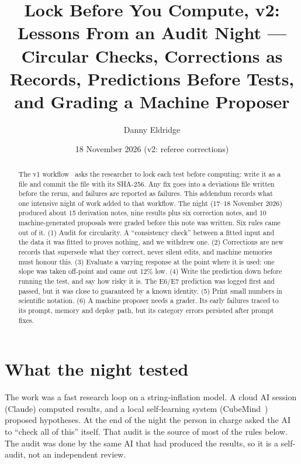 \documentclass[aps,prd,twocolumn,superscriptaddress,nofootinbib,showkeys]{revtex4-2}
\begin{document}
\title{Lock Before You Compute, v2: Lessons From an Audit Night --- Circular Checks, Corrections as Records, Predictions Before Tests, and Grading a Machine Proposer}
\author{Danny Eldridge}
\date{18 November 2026 (v2: referee corrections)}
\begin{abstract}
The v1 workflow~\cite{P4} asks the researcher to lock each test before computing: write it as a file and commit the file with its SHA-256. Any fix goes into a deviations file written before the rerun, and failures are reported as failures. This addendum records what one intensive night of work added to that workflow. The night (17--18 November 2026) produced about 15 derivation notes, nine results plus six correction notes, and 10 machine-generated proposals were graded before this note was written. Six rules came out of it. (1) Audit for circularity. A ``consistency check'' between a fitted input and the data it was fitted to proves nothing, and we withdrew one. (2) Corrections are new records that supersede what they correct, never silent edits, and machine memories must honour this. (3) Evaluate a varying response at the point where it is used: one slope was taken off-point and came out 12\% low. (4) Write the prediction down before running the test, and say how risky it is. The E6/E7 prediction was logged first and passed, but it was close to guaranteed by a known identity. (5) Print small numbers in scientific notation. (6) A machine proposer needs a grader. Its early failures traced to its prompt, memory and deploy path, but its category errors persisted after prompt fixes.
\end{abstract}
\maketitle

\section{What the night tested}
The work was a fast research loop on a string-inflation model. A cloud AI session (Claude) computed results, and a local self-learning system (CubeMind~\cite{CM}) proposed hypotheses. At the end of the night the person in charge asked the AI to ``check all of this'' itself. That audit is the source of most of the rules below. The audit was done by the same AI that had produced the results, so it is a self-audit, not an independent review.
\end{document}
